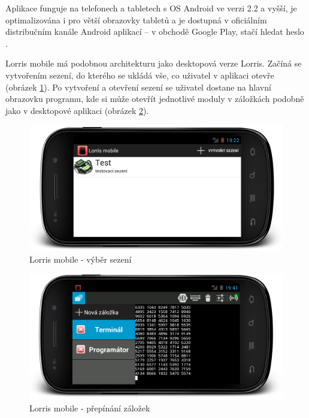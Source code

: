 \documentclass[12pt, a4paper, oneside]{article}
\begin{document}
Aplikace funguje na telefonech a tabletech s OS Android ve verzi 2.2 a vyšší, je optimalizována i pro větší obrazovky tabletů a je dostupná v oficiálním distribučním kanále Android aplikací -- v obchodě Google Play\cite{gplay}, stačí hledat heslo .

Lorris mobile má podobnou architekturu jako desktopová verze Lorris. Začíná se vytvořením sezení, do kterého se ukládá vše, co uživatel v aplikaci otevře (obrázek \ref{mobile_session}). Po vytvoření a otevření sezení se uživatel dostane na hlavní obrazovku programu, kde si může otevřít jednotlivé moduly v záložkách podobně jako v desktopové aplikaci (obrázek \ref{mobile_tabs}).

\begin{figure}[H]
\begin{center}
\includegraphics[width=\textwidth]{img/mobile_session.png}
\caption{Lorris mobile - výběr sezení}
\label{mobile_session}
\end{center}
\end{figure}
\begin{figure}[H]
\begin{center}
\includegraphics[width=\textwidth]{img/mobile_tabs.png}
\caption{Lorris mobile - přepínání záložek}
\label{mobile_tabs}
\end{center}
\end{figure}
\end{document}
